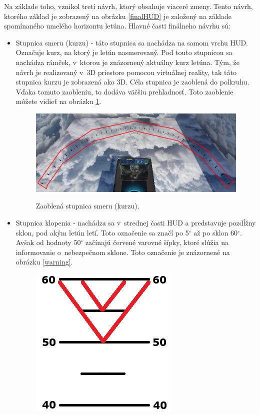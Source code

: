 Na základe toho, vznikol tretí návrh, ktorý obsahuje viaceré zmeny. Tento návrh, ktorého základ je zobrazený na obrázku \ref{finalHUD} je založený na základe spomínaného umelého horizontu letúna.
Hlavné časti finálneho návrhu sú:
\begin{itemize}
    \item Stupnica smeru (kurzu) - táto stupnica sa nachádza na samom vrchu HUD. Označuje kurz, na ktorý je letún nasmerovaný. Pod touto stupnicou sa nachádza rámček, v~ktorou je znázornený aktuálny kurz letúna. Tým, že návrh je realizovaný v~3D priestore pomocou virtuálnej reality, tak táto stupnica kurzu je zobrazená ako 3D. Céla stupnica je zaoblená do polkruhu. Vďaka tomuto zaobleniu, to dodáva väčšiu prehľadnosť. Toto zaoblenie môžete vidieť na obrázku \ref{3Dkurz}.
    \begin{figure}[ht]
\centering
\includegraphics[scale=0.4]{obrazky-figures/3Dkurz.png}
\caption{Zaoblená stupnica smeru (kurzu).}{\label{3Dkurz}}
\end{figure}
    \item Stupnica klopenia - nachádza sa v~strednej časti HUD a predstavuje pozdĺžny sklon, pod akým letún letí. Toto označenie sa značí po 5$^\circ$ až po sklon 60$^\circ$. Avšak od hodnoty 50$^\circ$ začínajú červené varovné šípky, ktoré slúžia na informovanie o~nebezpečnom sklone. Toto označenie je znázornené na obrázku \ref{warning}.
    \begin{figure}[ht]
\centering
\includegraphics[scale=0.61]{obrazky-figures/warning.png}

\end{figure}
\end{itemize}
